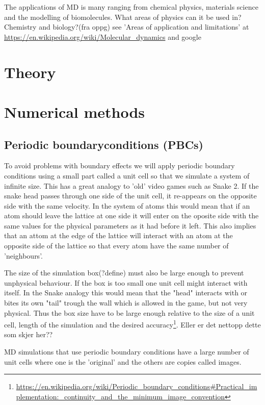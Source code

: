 \documentclass[11pt,a4wide]{article}
\begin{document}
The applications of MD is many ranging from chemical physics, materials science and the modelling of biomolecules.
What areas of physics can it be used in? Chemistry and biology?(fra oppg)
see 'Areas of application and limitations' at \url{https://en.wikipedia.org/wiki/Molecular\_dynamics} and google




\section{Theory}


\section{Numerical methods}

\subsection{Periodic boundaryconditions (PBCs)}
To avoid problems with boundary effects we will apply periodic boundary conditions using a small part called a unit cell so that we simulate a system of infinite size. This has a great analogy to 'old' video games such as Snake 2. If the snake head passes through one side of the unit cell, it re-appears on the opposite side with the same velocity. In the system of atoms this would mean that if an atom should leave the lattice at one side it will enter on the oposite side with the same values for the physical parameters as it had before it left. This also implies that an attom at the edge of the lattice will interact with an atom at the opposite side of the lattice so that every atom have the same number of 'neighbours'. 

The size of the simulation box(?define) must also be large enough to prevent unphysical behaviour. If the box is too small one unit cell might interact with itself. In the Snake analogy this would mean that the "head" interacts with or bites its own "tail" trough the wall which is allowed in the game, but not very physical. Thus the box size have to be large enough relative to the size of a unit cell, length of the simulation and the desired accuracy\footnote{\url{https://en.wikipedia.org/wiki/Periodic\_boundary\_conditions\#Practical\_implementation:\_continuity\_and\_the\_minimum\_image\_convention}}. Eller er det nettopp dette som skjer her??

MD simulations that use periodic boundary conditions have a large number of unit cells where one is the 'original' and the others are copies called images. 
\end{document}
